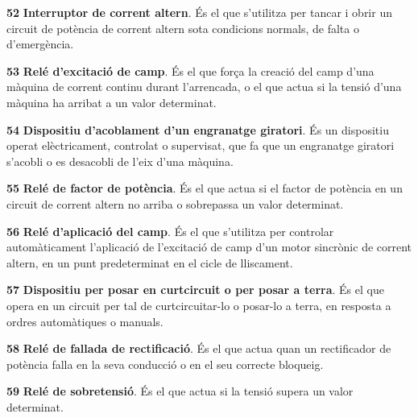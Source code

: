 \begin{multicols}{2}
\begin{list}{}
\item[\textbf{52}]   
\textbf{Interruptor de corrent altern}. És
 el que s'utilitza per tancar i obrir un circuit de potència de corrent altern sota condicions
normals, de falta o d'emergència.

\item[\textbf{53}]  
\textbf{Relé d'excitació de camp}. És el
que força la creació del camp d'una màquina de corrent continu
durant l'arrencada, o el que actua si la tensió d'una màquina ha
arribat a un valor determinat.

\item[\textbf{54}]  
\textbf{Dispositiu d'acoblament d'un engranatge giratori}. És un dispositiu operat elèctricament, controlat o supervisat, que fa que un engranatge giratori
s'acobli o es desacobli de l'eix d'una màquina.

\item[\textbf{55}]   
\textbf{Relé de factor de potència}. És el que actua si el factor de potència en un circuit de corrent altern no arriba o
sobrepassa un valor determinat.

\item[\textbf{56}]   
\textbf{Relé d'aplicació del camp}.
És el que s'utilitza per controlar automàticament l'aplicació de l'excitació de camp d'un
motor sincrònic de corrent altern, en un punt predeterminat en el cicle de lliscament.

\item[\textbf{57}]  
\textbf{Dispositiu per posar en  curtcircuit o per posar a terra}. És el que
opera en un circuit per tal de curtcircuitar-lo  o
posar-lo a terra, en resposta a ordres automàtiques o manuals.

\item[\textbf{58}]   
\textbf{Relé de fallada de rectificació}. És el que actua quan un rectificador de potència falla en la seva conducció o en el seu correcte bloqueig.

\item[\textbf{59}]   
\textbf{Relé de sobretensió}. És el que
actua si la tensió supera un valor determinat.


\end{list}
\end{multicols}
